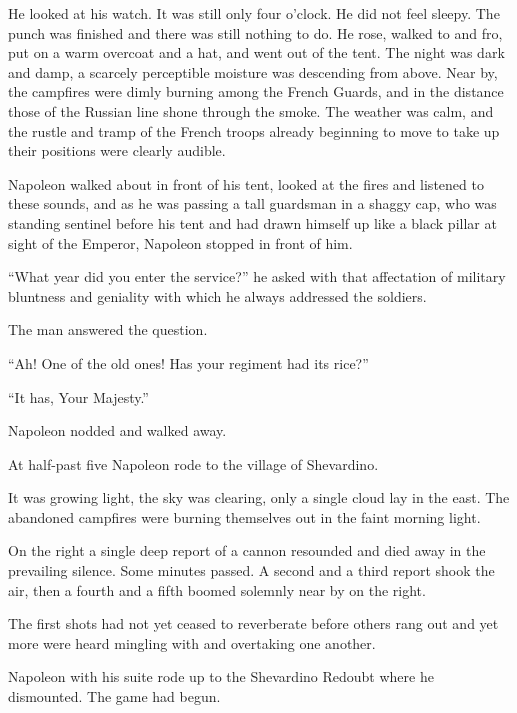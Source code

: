 He looked at his watch. It was still only four o'clock. He did
not feel sleepy. The punch was finished and there was still
nothing to do. He rose, walked to and fro, put on a warm overcoat
and a hat, and went out of the tent. The night was dark and damp,
a scarcely perceptible moisture was descending from above. Near
by, the campfires were dimly burning among the French Guards, and
in the distance those of the Russian line shone through the
smoke. The weather was calm, and the rustle and tramp of the
French troops already beginning to move to take up their
positions were clearly audible.

Napoleon walked about in front of his tent, looked at the fires
and listened to these sounds, and as he was passing a tall
guardsman in a shaggy cap, who was standing sentinel before his
tent and had drawn himself up like a black pillar at sight of the
Emperor, Napoleon stopped in front of him.

``What year did you enter the service?'' he asked with that
affectation of military bluntness and geniality with which he
always addressed the soldiers.

The man answered the question.

``Ah! One of the old ones! Has your regiment had its rice?''

``It has, Your Majesty.''

Napoleon nodded and walked away.

At half-past five Napoleon rode to the village of Shevardino.

It was growing light, the sky was clearing, only a single cloud
lay in the east. The abandoned campfires were burning themselves
out in the faint morning light.

On the right a single deep report of a cannon resounded and died
away in the prevailing silence. Some minutes passed. A second and
a third report shook the air, then a fourth and a fifth boomed
solemnly near by on the right.

The first shots had not yet ceased to reverberate before others
rang out and yet more were heard mingling with and overtaking one
another.

Napoleon with his suite rode up to the Shevardino Redoubt where
he dismounted. The game had begun.


